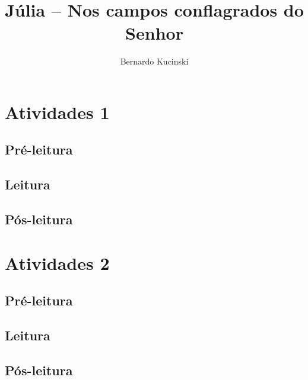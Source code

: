 \documentclass{extarticle}
\begin{document}
\newcommand{\AutorLivro}{Bernardo Kucinski}
\newcommand{\TituloLivro}{Júlia – Nos campos conflagrados do Senhor}
\newcommand{\Tema}{Ficção, mistério e fantasia}
\newcommand{\Genero}{Romance}
\newcommand{\imagemCapa}{./images/PNLD0053-01.png}
\newcommand{\issnppub}{---}
\newcommand{\issnepub}{---}
\newcommand{\colaborador}{\textbf{Fulano de Tal} é uma pessoa incrível e vai fazer um bom serviço.}


\title{\TituloLivro}
\author{\AutorLivro}
\def\authornotes{\colaborador}

\date{}
\maketitle

\begin{abstract}
\lipsum[1-3]
\end{abstract}

\tableofcontents




\section{Atividades 1}


\subsection{Pré-leitura}
\subsection{Leitura}
\subsection{Pós-leitura}



\section{Atividades 2}

\subsection{Pré-leitura}
\subsection{Leitura}
\subsection{Pós-leitura}

\lipsum
\end{document}
